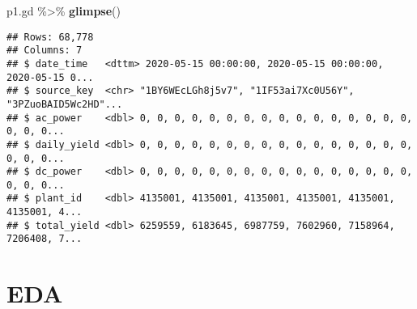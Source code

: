\documentclass[]{tufte-handout}
\newenvironment{Shaded}{}{}
\newcommand{\KeywordTok}[1]{\textcolor[rgb]{0.00,0.44,0.13}{\textbf{#1}}}
\newcommand{\NormalTok}[1]{#1}
\newcommand{\OperatorTok}[1]{\textcolor[rgb]{0.40,0.40,0.40}{#1}}
\newcommand{\StringTok}[1]{\textcolor[rgb]{0.25,0.44,0.63}{#1}}
\begin{document}
\begin{Shaded}
\begin{Highlighting}[]
\NormalTok{p1.gd }\OperatorTok{\%\textgreater{}\%}\StringTok{ }\KeywordTok{glimpse}\NormalTok{()}
\end{Highlighting}
\end{Shaded}

\begin{verbatim}
## Rows: 68,778
## Columns: 7
## $ date_time   <dttm> 2020-05-15 00:00:00, 2020-05-15 00:00:00, 2020-05-15 0...
## $ source_key  <chr> "1BY6WEcLGh8j5v7", "1IF53ai7Xc0U56Y", "3PZuoBAID5Wc2HD"...
## $ ac_power    <dbl> 0, 0, 0, 0, 0, 0, 0, 0, 0, 0, 0, 0, 0, 0, 0, 0, 0, 0, 0...
## $ daily_yield <dbl> 0, 0, 0, 0, 0, 0, 0, 0, 0, 0, 0, 0, 0, 0, 0, 0, 0, 0, 0...
## $ dc_power    <dbl> 0, 0, 0, 0, 0, 0, 0, 0, 0, 0, 0, 0, 0, 0, 0, 0, 0, 0, 0...
## $ plant_id    <dbl> 4135001, 4135001, 4135001, 4135001, 4135001, 4135001, 4...
## $ total_yield <dbl> 6259559, 6183645, 6987759, 7602960, 7158964, 7206408, 7...
\end{verbatim}

\hypertarget{eda}{%
\section{EDA}\label{eda}}
\end{document}
